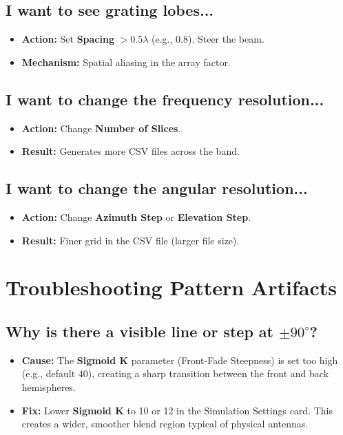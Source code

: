 \documentclass[11pt,a4paper]{article}
\begin{document}
\subsection{I want to see grating lobes...}
\begin{itemize}
    \item \textbf{Action:} Set \textbf{Spacing} $> 0.5\lambda$ (e.g., 0.8). Steer the beam.
    \item \textbf{Mechanism:} Spatial aliasing in the array factor.
\end{itemize}

\subsection{I want to change the frequency resolution...}
\begin{itemize}
    \item \textbf{Action:} Change \textbf{Number of Slices}.
    \item \textbf{Result:} Generates more CSV files across the band.
\end{itemize}

\subsection{I want to change the angular resolution...}
\begin{itemize}
    \item \textbf{Action:} Change \textbf{Azimuth Step} or \textbf{Elevation Step}.
    \item \textbf{Result:} Finer grid in the CSV file (larger file size).
\end{itemize}

\newpage
\section{Troubleshooting Pattern Artifacts}

\subsection{Why is there a visible line or step at $\pm 90^\circ$?}
\begin{itemize}
    \item \textbf{Cause:} The \textbf{Sigmoid K} parameter (Front-Fade Steepness) is set too high (e.g., default 40), creating a sharp transition between the front and back hemispheres.
    \item \textbf{Fix:} Lower \textbf{Sigmoid K} to 10 or 12 in the Simulation Settings card. This creates a wider, smoother blend region typical of physical antennas.
\end{itemize}
\end{document}
